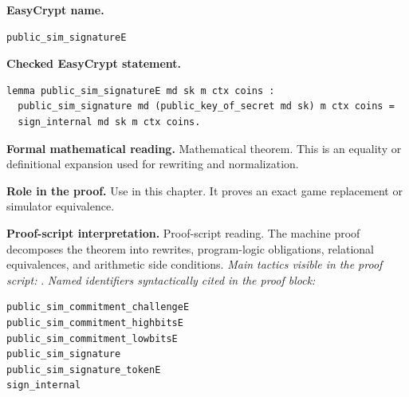 \begin{formaltheorem}
\noindent\textbf{EasyCrypt name.}
\begin{lstlisting}[language=EasyCrypt,basicstyle=\ttfamily\scriptsize]
public_sim_signatureE
\end{lstlisting}
\noindent\textbf{Checked EasyCrypt statement.}
\begin{lstlisting}[language=EasyCrypt,basicstyle=\ttfamily\scriptsize]
lemma public_sim_signatureE md sk m ctx coins :
  public_sim_signature md (public_key_of_secret md sk) m ctx coins =
  sign_internal md sk m ctx coins.
\end{lstlisting}
\noindent\textbf{Formal mathematical reading.}
Mathematical theorem. This is an equality or definitional expansion used for rewriting and normalization.

\noindent\textbf{Role in the proof.}
Use in this chapter. It proves an exact game replacement or simulator equivalence.

\noindent\textbf{Proof-script interpretation.}
Proof-script reading. The machine proof decomposes the theorem into rewrites, program-logic obligations, relational equivalences, and arithmetic side conditions.
\emph{Main tactics visible in the proof script:} .
\emph{Named identifiers syntactically cited in the proof block:}
\begin{lstlisting}[language=EasyCrypt,basicstyle=\ttfamily\scriptsize]
public_sim_commitment_challengeE
public_sim_commitment_highbitsE
public_sim_commitment_lowbitsE
public_sim_signature
public_sim_signature_tokenE
sign_internal
\end{lstlisting}

\end{formaltheorem}


